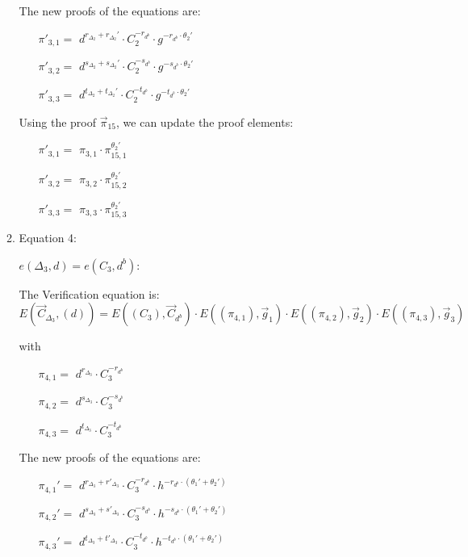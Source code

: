 \begin{description}
\begin{enumerate}
\begin{enumerate}
      The new proofs of the equations are:
      
      \begin{itemize}
      \item[$\pi'_{3,1} = $] $d^{r_{\Delta_2} + r_{\Delta_2}'} \cdot C_2^{-r_{d^b}} \cdot g^{-r_{d^b} \cdot \theta_2'}$    
      \item[$\pi'_{3,2} = $] $d^{s_{\Delta_2} + s_{\Delta_2}'} \cdot C_2^{-s_{d^b}} \cdot g^{-s_{d^b} \cdot \theta_2'}$    
      \item[$\pi'_{3,3} = $] $d^{t_{\Delta_2} + t_{\Delta_2}'} \cdot C_2^{-t_{d^b}} \cdot g^{-t_{d^b} \cdot \theta_2'}$
      \end{itemize}

      Using the proof $\vec{\pi}_{15}$, we can update the proof elements:

      \begin{itemize}
      \item[$\pi'_{3,1} = $] $\pi_{3,1} \cdot \pi_{15,1}^{\theta_2'}$    
      \item[$\pi'_{3,2} = $] $\pi_{3,2} \cdot \pi_{15,2}^{\theta_2'}$    
      \item[$\pi'_{3,3} = $] $\pi_{3,3} \cdot \pi_{15,3}^{\theta_2'}$
      \end{itemize}


      
    \item Equation 4:

      $e(\boxed{\Delta_3},d) = e(C_3, \boxed{d^b})$:
      
      The Verification equation is:  $E(\vec{C}_{\Delta_3}, (d)) = E((C_3), \vec{C}_{d^b}) \cdot E((\pi_{4,1}), \vec{g}_1)\cdot E((\pi_{4,2}), \vec{g}_2)\cdot E((\pi_{4,3}), \vec{g}_3)$
      
      with
      \begin{itemize}
      \item[$\pi_{4,1} = $] $d^{r_{\Delta_3}} \cdot C_3^{-r_{d^b}}$
      \item[$\pi_{4,2} = $] $d^{s_{\Delta_3}} \cdot C_3^{-s_{d^b}}$
      \item[$\pi_{4,3} = $] $d^{t_{\Delta_3}} \cdot C_3^{-t_{d^b}}$
      \end{itemize}

      The new proofs of the equations are:
      \begin{itemize}
      \item[$\pi_{4,1}' = $] $d^{r_{\Delta_3} + r'_{\Delta_3}} \cdot C_3^{-r_{d^b}} \cdot h^{- r_{d^b} \cdot (\theta_1'+ \theta_2')}$
      \item[$\pi_{4,2}' = $] $d^{s_{\Delta_3} + s'_{\Delta_3}} \cdot C_3^{-s_{d^b}} \cdot h^{- s_{d^b} \cdot (\theta_1'+ \theta_2')}$
      \item[$\pi_{4,3}' = $] $d^{t_{\Delta_3} + t'_{\Delta_3}} \cdot C_3^{-t_{d^b}} \cdot h^{- t_{d^b} \cdot (\theta_1'+ \theta_2')}$  
      \end{itemize}
      

\end{enumerate}
\end{enumerate}
\end{description}
